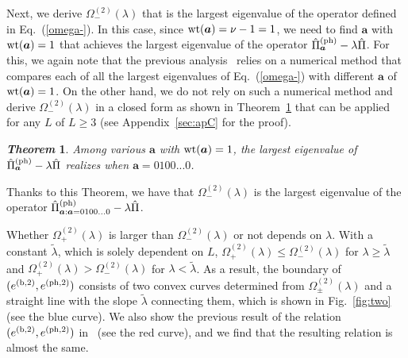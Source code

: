 \documentclass[prl,twocolumn,superscriptaddress,nofootinbib]{revtex4}
\newtheorem{theorem}{{\it \bf Theorem}}
\def\U#1{{\rm #1}}
\begin{document}
  Next, we derive $\Omega_-^{(2)}(\lambda)$ that is the largest eigenvalue of the operator defined in Eq.~(\ref{omega-}).
  In this case, since $\U{wt}({\bm{a}})=\nu-1=1$, we need to find $\bm{a}$ with $\U{wt}(\bm{a})=1$
  that achieves the largest eigenvalue of the operator $\hat{\Pi}^{\U{(ph)}}_{\bm{a}}-\lambda\hat{\Pi}$.
  For this, we again note that 
  the previous analysis~\cite{Kiyoshi2012dps} relies on a numerical method that compares each of
  all the largest eigenvalues of Eq.~(\ref{omega-}) with different $\bm{a}$ of $\U{wt}(\bm{a})=1$.
  On the other hand, we do not rely on such a numerical method and derive $\Omega_-^{(2)}(\lambda)$ in a closed form as shown 
  in Theorem~\ref{lemma3} that can be applied for any $L$ of $L\geq3$ (see Appendix~\ref{sec:apC} for the proof). 

 \begin{theorem}
  \label{lemma3}
  Among various $\bm{a}$ with $\U{wt}({\bm{a}})=1$, the largest eigenvalue of $\hat{\Pi}^{\U{(ph)}}_{\bm{a}}-\lambda\hat{\Pi}$
  realizes when $\bm{a}=0100...0$. 
 \end{theorem}
 Thanks to this Theorem, we have that $\Omega_-^{(2)}(\lambda)$ is the largest eigenvalue of the
 operator $\hat{\Pi}^{\U{(ph)}}_{\bm{a}:\bm{a}=0100...0}-\lambda\hat{\Pi}$. 
 
  Whether $\Omega_+^{(2)}(\lambda)$ is larger than $\Omega_-^{(2)}(\lambda)$ or not depends on $\lambda$.
  With a constant $\tilde{\lambda}$, which is solely dependent on $L$, $\Omega_+^{(2)}(\lambda)\leq\Omega_-^{(2)}(\lambda)$
  for $\lambda\geq\tilde{\lambda}$ and $\Omega_+^{(2)}(\lambda)>\Omega_-^{(2)}(\lambda)$ for $\lambda<\tilde{\lambda}$.
  As a result, the boundary of $(e^{(\U{b},2)},e^{(\U{ph},2)})$ consists of two convex curves determined from $\Omega_\pm^{(2)}(\lambda)$
  and a straight line with the slope $\tilde{\lambda}$ connecting them, which is shown in Fig.~\ref{fig:two}
  (see the blue curve).
  We also show the previous result of the relation $(e^{(\U{b},2)},e^{(\U{ph},2)})$ in~\cite{Kiyoshi2012dps} (see the red curve), 
  and we find that the resulting relation is almost the same. 
\\
\end{document}
